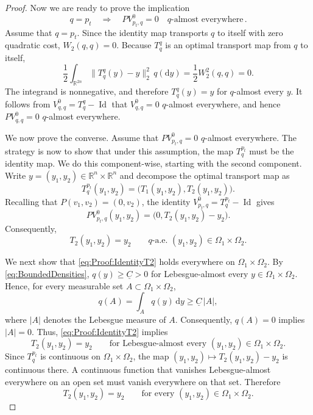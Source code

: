 \documentclass[10pt,a4paper]{amsart}
\newcommand{\R}{\mathbb{R}}
\begin{document}
\begin{proof}
Now we are ready to prove the implication
\[
    q=p_t
    \quad\Longrightarrow\quad
    PV_{p_t,q}^0=0
    \quad q\text{-almost everywhere}\,.
\]
Assume that $q=p_t$. Since the identity map transports $q$ to itself
with zero quadratic cost, $W_2(q,q)=0$. Because $T_q^q$ is an optimal
transport map from $q$ to itself,
\[
    \frac12
    \int_{\R^{2n}}
        \|T_q^q(y)-y\|_2^2
        \,q(\mathrm dy)
    =
    \frac12W_2^2(q,q)
    =
    0.
\]
The integrand is nonnegative, and therefore
$T_q^q(y)=y$ for $q$-almost every $y$. It follows from
$V_{q,q}^0=T_q^q-\operatorname{Id}$ that
$V_{q,q}^0=0$ $q$-almost everywhere, and hence
$PV_{q,q}^0=0$ $q$-almost everywhere.

We now prove the converse. Assume that
$PV_{p_t,q}^0=0$ $q$-almost everywhere. The strategy is now to show that under this assumption, the map $T_q^{p_t}$ must be the identity map. We do this component-wise, starting with the second component. Write
$y=(y_1,y_2)\in\R^n\times\R^n$ and decompose the optimal transport map
as
\[
    T_q^{p_t}(y_1,y_2)
    =
    \bigl(
        T_1(y_1,y_2),
        T_2(y_1,y_2)
    \bigr).
\]
Recalling that $P(v_1,v_2)=(0,v_2)$, the identity
$V_{p_t,q}^0=T_q^{p_t}-\operatorname{Id}$ gives
\[
    PV_{p_t,q}^0(y_1,y_2)
    =
    \bigl(
        0,
        T_2(y_1,y_2)-y_2
    \bigr).
\]
Consequently,
\begin{equation}\label{eq:Proof:IdentityT2}
    T_2(y_1,y_2)=y_2
    \qquad
    q\text{-a.e. }(y_1,y_2) \in \Omega_1 \times \Omega_2.
\end{equation}

We next show that \eqref{eq:Proof:IdentityT2} holds everywhere on
$\Omega_1\times\Omega_2$. By \eqref{eq:BoundedDensities},
$q(y)\geq \underline{C} >0$ for Lebesgue-almost every $y \in \Omega_1\times\Omega_2$. Hence, for every measurable
set $A\subset\Omega_1\times\Omega_2$,
\[
    q(A)
    =
    \int_A q(y)\,\mathrm dy
    \geq
    \underline{C}\,|A|,
\]
where $|A|$ denotes the Lebesgue measure of $A$. Consequently,
$q(A)=0$ implies $|A|=0$. Thus, \eqref{eq:Proof:IdentityT2} implies
\[
    T_2(y_1,y_2)=y_2
    \qquad
    \text{for Lebesgue-almost every }(y_1,y_2)
    \in\Omega_1\times\Omega_2.
\]
Since $T_q^{p_t}$ is continuous on $\Omega_1\times\Omega_2$, the map
$(y_1,y_2)\mapsto T_2(y_1,y_2)-y_2$ is continuous there. A continuous
function that vanishes Lebesgue-almost everywhere on an open set must
vanish everywhere on that set. Therefore
\begin{equation}\label{eq:Proof:T2IsIdentity}
    T_2(y_1,y_2)=y_2
    \qquad
    \text{for every }(y_1,y_2)\in\Omega_1\times\Omega_2.
\end{equation}




\end{proof}
\end{document}
